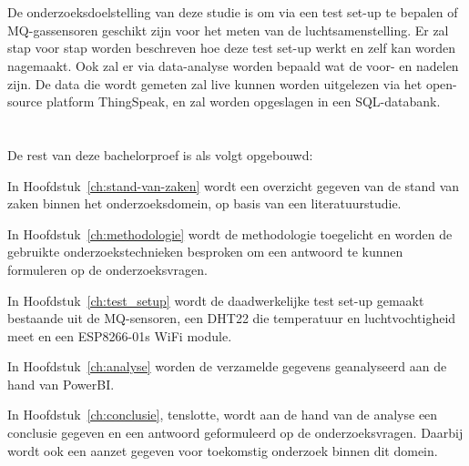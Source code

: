 \section{}%
\label{sec:onderzoeksdoelstelling}


De onderzoeksdoelstelling van deze studie is om via een test set-up te bepalen of MQ-gassensoren geschikt zijn voor het meten van de luchtsamenstelling. Er zal stap voor stap worden beschreven hoe deze test set-up werkt en zelf kan worden nagemaakt. Ook zal er via data-analyse worden bepaald wat de voor- en nadelen zijn. De data die wordt gemeten zal live kunnen worden uitgelezen via het open-source platform ThingSpeak, en zal worden opgeslagen in een SQL-databank.



\section{}%
\label{sec:opzet-bachelorproef}


De rest van deze bachelorproef is als volgt opgebouwd:

In Hoofdstuk~\ref{ch:stand-van-zaken} wordt een overzicht gegeven van de stand van zaken binnen het onderzoeksdomein, op basis van een literatuurstudie.

In Hoofdstuk~\ref{ch:methodologie} wordt de methodologie toegelicht en worden de gebruikte onderzoekstechnieken besproken om een antwoord te kunnen formuleren op de onderzoeksvragen.


In Hoofdstuk~\ref{ch:test_setup} wordt de daadwerkelijke test set-up gemaakt bestaande uit de MQ-sensoren, een DHT22 die temperatuur en luchtvochtigheid meet en een ESP8266-01s WiFi module.

In Hoofdstuk~\ref{ch:analyse} worden de verzamelde gegevens geanalyseerd aan de hand van PowerBI.


In Hoofdstuk~\ref{ch:conclusie}, tenslotte, wordt aan de hand van de analyse een conclusie gegeven en een antwoord geformuleerd op de onderzoeksvragen. Daarbij wordt ook een aanzet gegeven voor toekomstig onderzoek binnen dit domein.